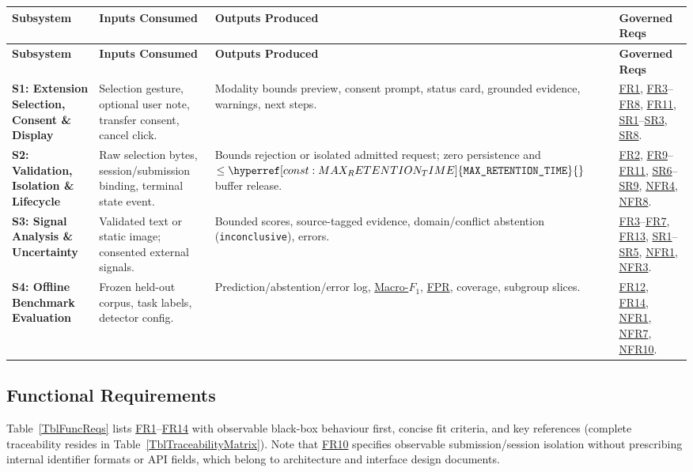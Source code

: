 \documentclass[11pt]{article}
\newcommand{\MaxRetentionTime}{\hyperref[const:MAX_RETENTION_TIME]{\texttt{MAX\_\allowbreak{}RETENTION\_\allowbreak{}TIME}}}
\newcommand{\FPR}{\hyperlink{acr-fpr}{FPR}}
\newcommand{\TermMacroFOne}{\hyperlink{gls-macrof1}{Macro-$F_1$}}
\begin{document}
{\small
\begin{tabularx}{\textwidth}{P{3.0cm} Y Y P{2.8cm}}
\caption{Black-Box Subsystem Input/Output Boundaries} \label{TblSubsystemMapping}\\
\toprule
\textbf{Subsystem} & \textbf{Inputs Consumed} & \textbf{Outputs Produced} & \textbf{Governed Reqs}\\
\midrule
\endfirsthead
\toprule
\textbf{Subsystem} & \textbf{Inputs Consumed} & \textbf{Outputs Produced} & \textbf{Governed Reqs}\\
\midrule
\endhead
\bottomrule
\endfoot
\textbf{S1: Extension Selection, Consent \& Display} & Selection gesture, optional user note, transfer consent, cancel click. & Modality bounds preview, consent prompt, status card, grounded evidence, warnings, next steps. & \hyperref[FR1]{FR1}, \hyperref[FR3]{FR3}--\hyperref[FR8]{FR8}, \hyperref[FR11]{FR11}, \hyperref[SR1]{SR1}--\hyperref[SR3]{SR3}, \hyperref[SR8]{SR8}.\\
\midrule
\textbf{S2: Validation, Isolation \& Lifecycle} & Raw selection bytes, session/submission binding, terminal state event. & Bounds rejection or isolated admitted request; zero persistence and $\le \MaxRetentionTime{}$ buffer release. & \hyperref[FR2]{FR2}, \hyperref[FR9]{FR9}--\hyperref[FR11]{FR11}, \hyperref[SR6]{SR6}--\hyperref[SR9]{SR9}, \hyperref[NFR4]{NFR4}, \hyperref[NFR8]{NFR8}.\\
\midrule
\textbf{S3: Signal Analysis \& Uncertainty} & Validated text or static image; consented external signals. & Bounded scores, source-tagged evidence, domain/conflict abstention (\texttt{inconclusive}), errors. & \hyperref[FR3]{FR3}--\hyperref[FR7]{FR7}, \hyperref[FR13]{FR13}, \hyperref[SR1]{SR1}--\hyperref[SR5]{SR5}, \hyperref[NFR1]{NFR1}, \hyperref[NFR3]{NFR3}.\\
\midrule
\textbf{S4: Offline Benchmark Evaluation} & Frozen held-out corpus, task labels, detector config. & Prediction/abstention/error log, \TermMacroFOne{}, \FPR{}, coverage, subgroup slices. & \hyperref[FR12]{FR12}, \hyperref[FR14]{FR14}, \hyperref[NFR1]{NFR1}, \hyperref[NFR7]{NFR7}, \hyperref[NFR10]{NFR10}.\\
\end{tabularx}
}

\subsection{Functional Requirements}\label{subsec:func-reqs}

Table~\ref{TblFuncReqs} lists \hyperref[FR1]{FR1}--\hyperref[FR14]{FR14} with observable black-box behaviour first, concise fit criteria, and key references (complete traceability resides in Table~\ref{TblTraceabilityMatrix}). Note that \hyperref[FR10]{FR10} specifies observable submission/session isolation without prescribing internal identifier formats or API fields, which belong to architecture and interface design documents.
\end{document}

